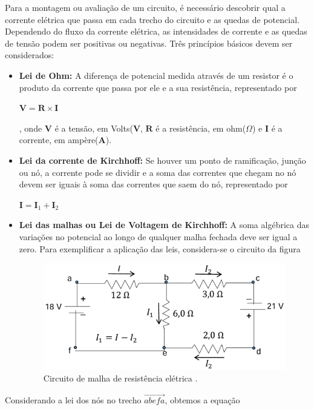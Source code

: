Para a montagem ou avaliação de um circuito, é necessário descobrir qual a corrente elétrica que passa em cada trecho do circuito e as quedas de potencial. Dependendo do fluxo da corrente elétrica, as intensidades de corrente e as quedas de tensão podem ser positivas ou negativas. Três princípios básicos devem ser considerados:

\begin{itemize}
	\item \textbf{Lei de Ohm:} A diferença de potencial medida através de um resistor é o produto da corrente que passa por ele e a sua resistência, representado por
	
	\centerline{$\mathbf{V} = \mathbf{R} \times \mathbf{I}$},
	onde $\mathbf{V}$ é a tensão, em Volts($\mathbf{V}$, $\mathbf{R}$ é a resistência, em ohm($\Omega$) e $\mathbf{I}$ é a corrente, em ampère($\mathbf{A}$).
	
	\item \textbf{Lei da corrente de Kirchhoff:} Se houver um ponto de ramificação, junção ou nó, a corrente pode se dividir e a soma das correntes que chegam no nó devem ser iguais à soma das correntes que saem do nó, representado por
	
	\centerline{$\mathbf{I} = \mathbf{I}_1 + \mathbf{I}_2$}
	
	\item \textbf{Lei das malhas ou Lei de Voltagem de Kirchhoff:} A soma algébrica das variações no potencial ao longo de qualquer malha fechada deve ser igual a zero. Para exemplificar a aplicação das leis, considera-se o circuito da figura
	
	\begin{figure}[H]
		\centering
		\includegraphics[scale=0.90]{a_fg2.png}
		\caption{Circuito de malha de resistência elétrica \cite{sirlandro2017}.}
	\end{figure}
\end{itemize}

Considerando a lei dos nós no trecho $\overrightarrow{abefa}$, obtemos a equação

